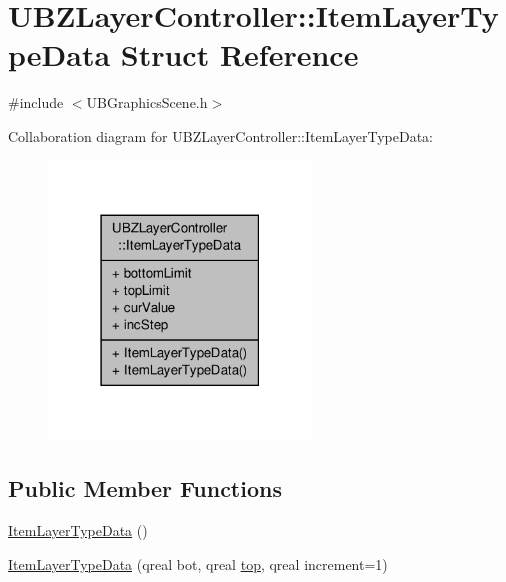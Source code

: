 \hypertarget{struct_u_b_z_layer_controller_1_1_item_layer_type_data}{\section{U\-B\-Z\-Layer\-Controller\-:\-:Item\-Layer\-Type\-Data Struct Reference}
\label{d7/d85/struct_u_b_z_layer_controller_1_1_item_layer_type_data}
}


{\ttfamily \#include $<$U\-B\-Graphics\-Scene.\-h$>$}



Collaboration diagram for U\-B\-Z\-Layer\-Controller\-:\-:Item\-Layer\-Type\-Data\-:
\nopagebreak
\begin{figure}[H]
\begin{center}
\leavevmode
\includegraphics[width=198pt]{df/d46/struct_u_b_z_layer_controller_1_1_item_layer_type_data__coll__graph}
\end{center}
\end{figure}
\subsection*{Public Member Functions}
\begin{DoxyCompactItemize}
\item 
\hyperlink{struct_u_b_z_layer_controller_1_1_item_layer_type_data_a6fc53cc1a1fa0e916cb9b39e44e57fc9}{Item\-Layer\-Type\-Data} ()
\item 
\hyperlink{struct_u_b_z_layer_controller_1_1_item_layer_type_data_a92a48e732122dce5b4dc911487a644f9}{Item\-Layer\-Type\-Data} (qreal bot, qreal \hyperlink{class_u_b_z_layer_controller_aaea26acb88959955623736b3127f96b3a5c881d20f56fa453c2a32b9e981782bf}{top}, qreal increment=1)
\end{DoxyCompactItemize}
